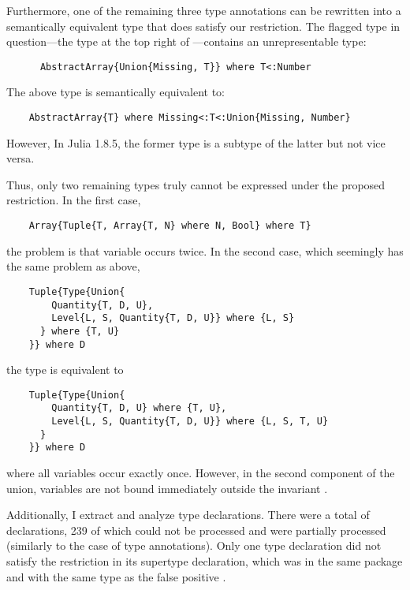 Furthermore, one of the remaining three type annotations can be rewritten
into a semantically equivalent
type that does satisfy our restriction. The flagged type in 
question---the  type at the top right of
---contains an unrepresentable type:
\begin{codeenvd}
\begin{lstlisting}
      AbstractArray{Union{Missing, T}} where T<:Number
\end{lstlisting}
\end{codeenvd}
The above type is semantically equivalent to:
\begin{codeenvd}
\begin{lstlisting}
    AbstractArray{T} where Missing<:T<:Union{Missing, Number}
\end{lstlisting}
\end{codeenvd}
However, In Julia 1.8.5, the former type is a subtype of the latter
but not vice versa.

Thus, only two remaining types truly cannot be expressed under
the proposed restriction.
%
In the first case, 
\begin{codeenvd}
\begin{lstlisting}
    Array{Tuple{T, Array{T, N} where N, Bool} where T}
\end{lstlisting}
\end{codeenvd}
the problem is that variable  occurs twice.
%
In the second case, which seemingly has the same problem as above,
\begin{codeenvd}
\begin{lstlisting}
    Tuple{Type{Union{
        Quantity{T, D, U}, 
        Level{L, S, Quantity{T, D, U}} where {L, S}
      } where {T, U}
    }} where D
\end{lstlisting}
\end{codeenvd}
the type is equivalent to
\begin{codeenvd}
\begin{lstlisting}
    Tuple{Type{Union{
        Quantity{T, D, U} where {T, U}, 
        Level{L, S, Quantity{T, D, U}} where {L, S, T, U}
      }
    }} where D
\end{lstlisting}
\end{codeenvd}
where all variables occur exactly once.
However, in the second component of the union, variables 
are not bound immediately outside the invariant .

Additionally, I extract and analyze type declarations.
There were a total of  declarations,
239 of which could not be processed and  were partially
processed (similarly to the case of type annotations). 
Only one type declaration did not satisfy the restriction in its supertype
declaration, which was in the same package and with the same type as the
false positive .


